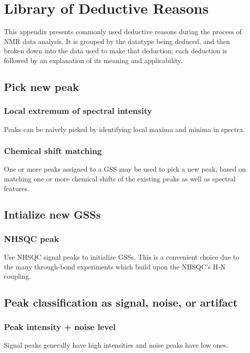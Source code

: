 \chapter{Library of Deductive Reasons}
\label{sec_library}

This appendix presents commonly used deductive reasons during the process
of NMR data analysis.  It is grouped by the datatype being deduced, and then
broken down into the data used to make that deduction; each deduction is 
followed by an explanation of its meaning and applicability.


\section*{Pick new peak}

\subsection*{Local extremum of spectral intensity}
Peaks can be naively picked by identifying local maxima and minima in spectra.

\subsection*{Chemical shift matching}
One or more peaks assigned to a GSS may be used to pick a new peak,
based on matching one or more chemical shifts of the existing peaks
as well as spectral features.



\section*{Intialize new GSSs}

\subsection*{NHSQC peak}
Use NHSQC signal peaks to initialize GSSs.  This is a convenient choice due
to the many through-bond experiments which build upon the NHSQC's H-N coupling.



\section*{Peak classification as signal, noise, or artifact}

\subsection*{Peak intensity + noise level}
Signal peaks generally have high intensities and noise peaks have low ones.

